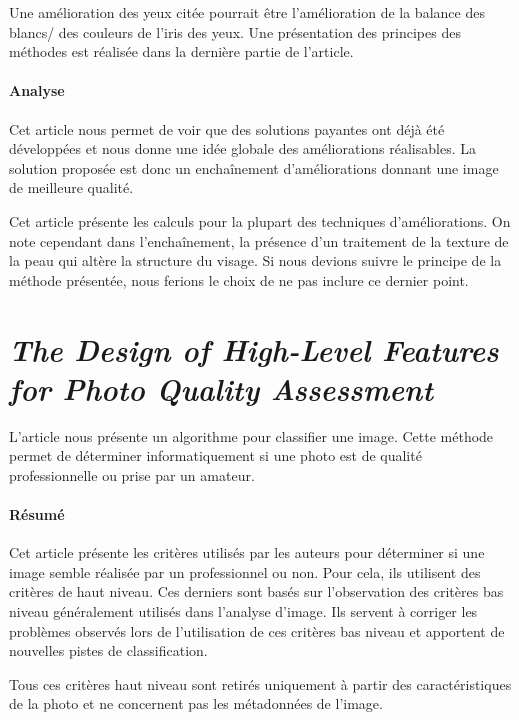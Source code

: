 \documentclass[11pt, french]{report-rd-info}
\begin{document}
Une amélioration des yeux citée pourrait être l’amélioration de la balance des blancs/ des couleurs de l’iris des yeux. Une présentation des principes des méthodes est réalisée dans la dernière partie de l’article.

\paragraph{Analyse}
Cet article nous permet de voir que des solutions payantes ont déjà été développées et nous donne une idée globale des améliorations réalisables. La solution proposée est donc un enchaînement d’améliorations donnant une image de meilleure qualité. 

Cet article présente les calculs pour la plupart des techniques d’améliorations. On note cependant dans l'enchaînement, la présence d’un traitement de la texture de la peau qui altère la structure du visage. Si nous devions suivre le principe de la méthode présentée, nous ferions le choix de ne pas inclure ce dernier point.


\section{\emph{The Design of High-Level Features for Photo Quality Assessment}}
L'article \cite{Ke} nous présente un algorithme pour classifier une image. Cette méthode permet de déterminer informatiquement si une photo est de qualité professionnelle ou prise par un amateur.

\paragraph{Résumé}
Cet article présente les critères utilisés par les auteurs pour déterminer si une image semble réalisée par un professionnel ou non. Pour cela, ils utilisent des critères de haut niveau. Ces derniers sont basés sur l'observation des critères bas niveau généralement utilisés dans l'analyse d'image. Ils servent à corriger les problèmes observés lors de l'utilisation de ces critères bas niveau et apportent de nouvelles pistes de classification.

Tous ces critères haut niveau sont retirés uniquement à partir des caractéristiques de la photo et ne concernent pas les métadonnées de l'image.
\end{document}
